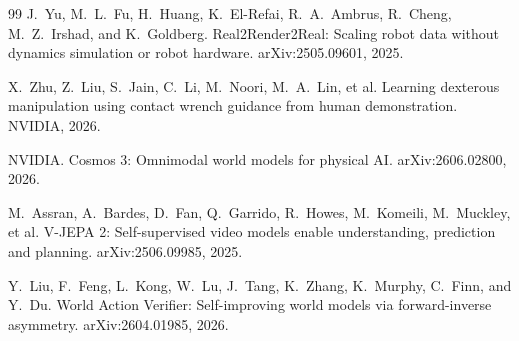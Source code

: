 \documentclass[11pt]{article}
\begin{document}
\begin{thebibliography}{99}
J.~Yu, M.~L.~Fu, H.~Huang, K.~El-Refai, R.~A.~Ambrus, R.~Cheng, M.~Z.~Irshad, and K.~Goldberg.
\newblock Real2Render2Real: Scaling robot data without dynamics simulation or robot hardware.
\newblock arXiv:2505.09601, 2025.

X.~Zhu, Z.~Liu, S.~Jain, C.~Li, M.~Noori, M.~A.~Lin, et al.
\newblock Learning dexterous manipulation using contact wrench guidance from human demonstration.
\newblock NVIDIA, 2026.

NVIDIA.
\newblock Cosmos 3: Omnimodal world models for physical AI.
\newblock arXiv:2606.02800, 2026.

M.~Assran, A.~Bardes, D.~Fan, Q.~Garrido, R.~Howes, M.~Komeili, M.~Muckley, et al.
\newblock V-JEPA 2: Self-supervised video models enable understanding, prediction and planning.
\newblock arXiv:2506.09985, 2025.

Y.~Liu, F.~Feng, L.~Kong, W.~Lu, J.~Tang, K.~Zhang, K.~Murphy, C.~Finn, and Y.~Du.
\newblock World Action Verifier: Self-improving world models via forward-inverse asymmetry.
\newblock arXiv:2604.01985, 2026.

\end{thebibliography}
\end{document}
